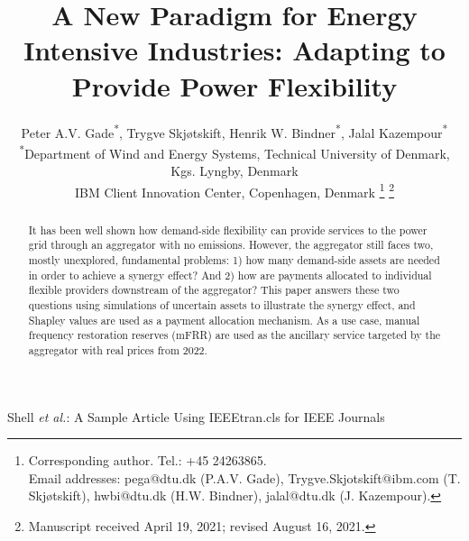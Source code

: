 \documentclass[lettersize,journal]{IEEEtran}
\begin{document}
\title{A New Paradigm for Energy Intensive Industries: Adapting to Provide Power Flexibility}

\author{Peter A.V. Gade\textsuperscript{*}\textsuperscript{\textdagger}, Trygve Skjøtskift\textsuperscript{\textdagger}, Henrik W. Bindner\textsuperscript{*}, Jalal Kazempour\textsuperscript{*} \\
    \textsuperscript{*}Department of Wind and Energy Systems, Technical University of Denmark, Kgs. Lyngby, Denmark \\
    \textsuperscript{\textdagger}IBM Client Innovation Center, Copenhagen, Denmark
    \thanks{Corresponding author. Tel.: +45 24263865. \\ Email addresses: pega@dtu.dk (P.A.V. Gade), Trygve.Skjotskift@ibm.com (T. Skjøtskift), hwbi@dtu.dk (H.W. Bindner), jalal@dtu.dk (J. Kazempour).}%
    \thanks{Manuscript received April 19, 2021; revised August 16, 2021.}}


%
{Shell \MakeLowercase{\textit{et al.}}: A Sample Article Using IEEEtran.cls for IEEE Journals}


\maketitle


\begin{abstract}
    It has been well shown how demand-side flexibility can provide services to the power grid through an aggregator with no emissions. However, the aggregator still faces two, mostly unexplored, fundamental problems: 1) how many demand-side assets are needed in order to achieve a synergy effect? And 2) how are payments allocated to individual flexible providers downstream of the aggregator? This paper answers these two questions using simulations of uncertain assets to illustrate the synergy effect, and Shapley values are used as a payment allocation mechanism. As a use case, manual frequency restoration reserves (mFRR) are used as the ancillary service targeted by the aggregator with real prices from 2022.
\end{abstract}
\end{document}
